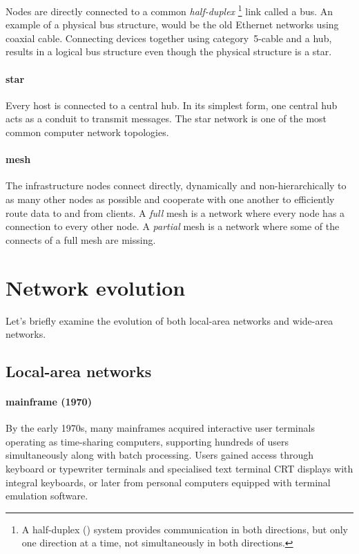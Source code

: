 Nodes are directly connected to a common \emph{half-duplex}%
\footnote{A half-duplex () system provides communication in both directions, but only one direction at a time, not simultaneously in both directions.}
link called a bus.
An example of a physical bus structure, would be the old Ethernet networks using coaxial cable.
Connecting devices together using category~5-cable and a hub, results in a logical bus structure even though the physical structure is a star.

\paragraph{star}
Every host is connected to a central hub.
In its simplest form, one central hub acts as a conduit to transmit messages.
The star network is one of the most common computer network topologies.


\paragraph{mesh}
The infrastructure nodes connect directly, dynamically and non-hi\-er\-ar\-chi\-cal\-ly to as many other nodes as possible and cooperate with one another to efficiently route data to and from clients.
A \emph{full} mesh is a network where every node has a connection to every other node.
A \emph{partial} mesh is a network where some of the connects of a full mesh are missing.




\section{Network evolution}
\label{sec:network-evolution}

Let's briefly examine the evolution of both local-area networks and wide-area networks.

\subsection{Local-area networks}
\label{sec:network-evolution-lan}

\paragraph{mainframe (1970)}%
By the early 1970s, many mainframes acquired interactive user terminals operating as time-sharing computers, supporting hundreds of users simultaneously along with batch processing.
Users gained access through keyboard or typewriter terminals%
and specialised text terminal \gls{CRT} displays with integral keyboards, or later from personal computers equipped with terminal emulation software.

